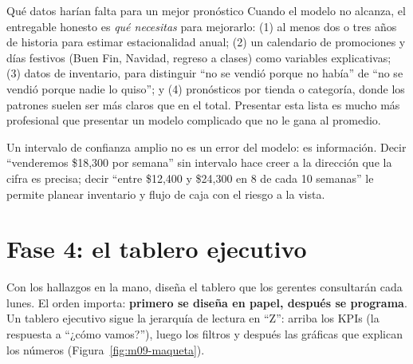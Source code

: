 \begin{negocio}{Qué datos harían falta para un mejor pronóstico}
Cuando el modelo no alcanza, el entregable honesto es \emph{qué necesitas}
para mejorarlo: (1) al menos dos o tres años de historia para estimar
estacionalidad anual; (2) un calendario de promociones y días festivos (Buen
Fin, Navidad, regreso a clases) como variables explicativas; (3) datos de
inventario, para distinguir ``no se vendió porque no había'' de ``no se
vendió porque nadie lo quiso''; y (4) pronósticos por tienda o categoría,
donde los patrones suelen ser más claros que en el total. Presentar esta
lista es mucho más profesional que presentar un modelo complicado que no le
gana al promedio.
\end{negocio}

\begin{advertencia}
Un intervalo de confianza amplio no es un error del modelo: es información.
Decir ``venderemos \$18,300 por semana'' sin intervalo hace creer a la
dirección que la cifra es precisa; decir ``entre \$12,400 y \$24,300 en 8 de
cada 10 semanas'' le permite planear inventario y flujo de caja con el
riesgo a la vista.
\end{advertencia}

\section{Fase 4: el tablero ejecutivo}
\label{sec:m09-dashboard}

Con los hallazgos en la mano, diseña el tablero que los gerentes consultarán
cada lunes. El orden importa: \textbf{primero se diseña en papel, después se
programa}. Un tablero ejecutivo sigue la jerarquía de lectura en ``Z'':
arriba los KPIs (la respuesta a ``¿cómo vamos?''), luego los filtros y
después las gráficas que explican los números
(Figura~\ref{fig:m09-maqueta}).

